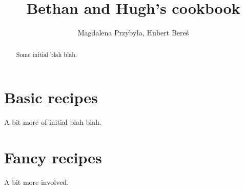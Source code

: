 \documentclass[%
a4paper,
11pt
]{article}
\begin{document}
\title{Bethan and Hugh's cookbook}
\author{Magdalena Przybyła, Hubert Bereś}
\maketitle

\begin{abstract}
    Some initial blah blah.
\end{abstract}

\tableofcontents

\vspace{5em}

\section{Basic recipes}
A bit more of initial blah blah.

\newpage

\newpage

\newpage

\newpage

\newpage

\newpage

\newpage

\newpage

\newpage

\newpage

\newpage

\newpage

\newpage

\newpage

\newpage

\newpage

\newpage

\newpage
 
\newpage

\newpage

\newpage

\newpage

\newpage

\newpage

\newpage

\newpage

\newpage

\newpage

\newpage

\newpage

\newpage

\newpage

\newpage


\section{Fancy recipes}
A bit more involved.


\newpage

\newpage

\newpage

\newpage

\newpage

\newpage

\newpage

\newpage

\newpage

\newpage

\end{document}
